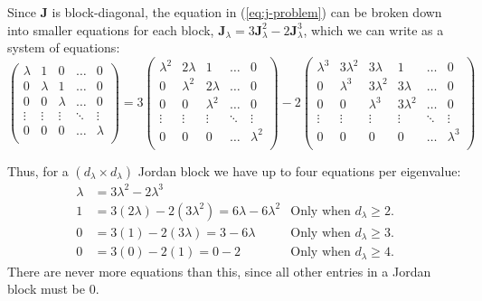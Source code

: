 \documentclass{article}
\theoremstyle{plain}
\theoremstyle{definition}
\theoremstyle{remark}
\newcommand{\vJ}{\mathbf{J}}
\begin{document}
Since $\vJ$ is block-diagonal, the equation in (\ref{eq:j-problem}) can be broken down into smaller equations for each block, ${\vJ_{\lambda} = 3\vJ_{\lambda}^2 - 2\vJ_{\lambda}^3}$, which we can write as a system of equations:
\begin{equation}
    \begin{pmatrix}
        \lambda & 1       & 0       & \hdots & 0       \\
        0       & \lambda & 1       & \hdots & 0       \\
        0       & 0       & \lambda & \hdots & 0       \\
        \vdots  & \vdots  & \vdots  & \ddots & \vdots  \\
        0       & 0       & 0       & \hdots & \lambda \\
    \end{pmatrix} = 3\begin{pmatrix}
        \lambda^2 & 2\lambda  & 1         & \hdots & 0         \\
        0         & \lambda^2 & 2\lambda  & \hdots & 0         \\
        0         & 0         & \lambda^2 & \hdots & 0         \\
        \vdots    & \vdots    & \vdots    & \ddots & \vdots    \\
        0         & 0         & 0         & \hdots & \lambda^2 \\
    \end{pmatrix} - 2\begin{pmatrix}
        \lambda^3 & 3\lambda^2 & 3\lambda   & 1          & \hdots & 0         \\
        0         & \lambda^3  & 3\lambda^2 & 3\lambda   & \hdots & 0         \\
        0         & 0          & \lambda^3  & 3\lambda^2 & \hdots & 0         \\
        \vdots    & \vdots     & \vdots     & \vdots     & \ddots & \vdots    \\
        0         & 0          & 0          & 0          & \hdots & \lambda^3 \\
    \end{pmatrix}
\end{equation}

Thus, for a ${(d_\lambda \times d_\lambda)}$ Jordan block we have up to four equations per eigenvalue:
\begin{align}
    \lambda & = 3\lambda^2 - 2\lambda^3                             & \label{eq:app-cond1}                                    \\
    1       & = 3(2\lambda) - 2(3\lambda^2) = 6\lambda - 6\lambda^2 & \text{Only when $d_\lambda \geq2$.}\label{eq:app-cond2} \\
    0       & = 3(1) - 2(3\lambda) = 3 - 6\lambda                   & \text{Only when $d_\lambda \geq3$.}\label{eq:app-cond3} \\
    0       & = 3(0) - 2(1) = 0 - 2                                 & \text{Only when $d_\lambda \geq4$.}\label{eq:app-cond4}
\end{align}
There are never more equations than this, since all other entries in a Jordan block must be 0.
\end{document}
